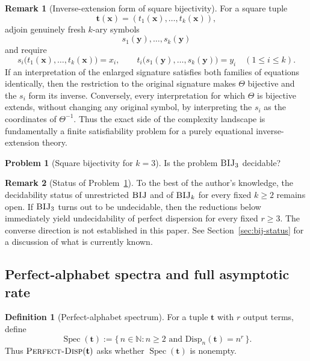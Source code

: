 \documentclass[11pt]{article}
\theoremstyle{definition}
\newtheorem{definition}{Definition}[section]
\newtheorem{problem}{Problem}[section]
\newtheorem{remark}{Remark}[section]
\theoremstyle{plain}
\newcommand{\Disp}{\mathrm{Disp}}
\newcommand{\PerfSpec}{\operatorname{Spec}}
\begin{document}
\begin{remark}[Inverse-extension form of square bijectivity]
\label{rem:inverse-extension}
For a square tuple
\[
\mathbf t(\mathbf x)=(t_1(\mathbf x),\dots,t_k(\mathbf x)),
\]
adjoin genuinely fresh $k$-ary symbols
\[
s_1(\mathbf y),\dots,s_k(\mathbf y)
\]
and require
\[
s_i\bigl(t_1(\mathbf x),\dots,t_k(\mathbf x)\bigr)=x_i,
\qquad
t_i\bigl(s_1(\mathbf y),\dots,s_k(\mathbf y)\bigr)=y_i
\quad (1\le i\le k).
\]
If an interpretation of the enlarged signature satisfies both families of equations identically, then the
restriction to the original signature makes $\Theta$ bijective and the $s_i$ form its inverse.  Conversely,
every interpretation for which $\Theta$ is bijective extends, without changing any original symbol, by
interpreting the $s_i$ as the coordinates of $\Theta^{-1}$.
Thus the exact side of the complexity landscape is fundamentally a finite satisfiability problem for a purely equational
inverse-extension theory.
\end{remark}

\begin{problem}[Square bijectivity for $k=3$]
\label{prob:bij3-open}
Is the problem $\textsc{BIJ}_3$ decidable?
\end{problem}

\begin{remark}[Status of Problem~\ref{prob:bij3-open}]
\label{rem:bij-status-brief}
To the best of the author's knowledge, the decidability status of unrestricted $\textsc{BIJ}$ and of
$\textsc{BIJ}_k$ for every fixed $k\ge 2$ remains open.  If $\textsc{BIJ}_3$ turns out to be undecidable, then
the reductions below immediately yield undecidability of perfect dispersion for every fixed $r\ge 3$.  The
converse direction is not established in this paper.  See Section~\ref{sec:bij-status} for a discussion of what
is currently known.
\end{remark}

\subsection{Perfect-alphabet spectra and full asymptotic rate}
\label{subsec:perfect-implies-rate}

\begin{definition}[Perfect-alphabet spectrum]
\label{def:perfect-spectrum}
For a tuple $\mathbf t$ with $r$ output terms, define
\[
\PerfSpec(\mathbf t)
:=
\{\,n\in\mathbb N:n\ge2\text{ and }\Disp_n(\mathbf t)=n^r\,\}.
\]
Thus $\textsc{Perfect-Disp}(\mathbf t)$ asks whether $\PerfSpec(\mathbf t)$ is nonempty.
\end{definition}
\end{document}
